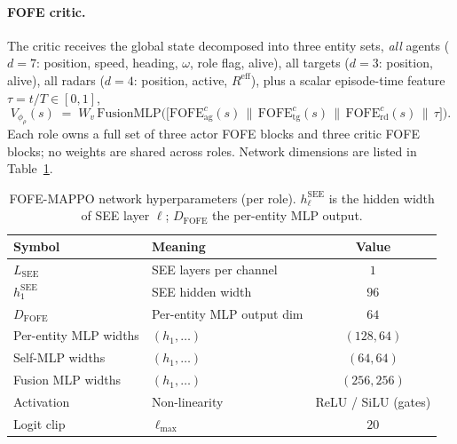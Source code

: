 \paragraph{FOFE critic.}
The critic receives the global state decomposed into three entity sets,
\emph{all} agents ($d{=}7$: position, speed, heading, $\omega$, role flag,
alive), all targets ($d{=}3$: position, alive), all radars ($d{=}4$:
position, active, $R^{\mathrm{eff}}$), plus a scalar episode-time feature
$\tau=t/T\in[0,1]$,
\begin{equation}
V_{\phi_\rho}(s) \;=\; W_v\,\mathrm{FusionMLP}\!\bigl(
\bigl[\mathrm{FOFE}^{c}_{\mathrm{ag}}(s)\,\|\,\mathrm{FOFE}^{c}_{\mathrm{tg}}(s)
\,\|\,\mathrm{FOFE}^{c}_{\mathrm{rd}}(s)\,\|\,\tau\bigr]\bigr).
\label{eq:fofe_critic}
\end{equation}
Each role owns a full set of three actor FOFE blocks and three critic FOFE
blocks; no weights are shared across roles. Network dimensions are listed in
Table~\ref{tab:fofe_params}.

\begin{table}[H]
\centering
\caption{FOFE-MAPPO network hyperparameters (per role). $h^{\mathrm{SEE}}_\ell$
is the hidden width of SEE layer $\ell$; $D_{\mathrm{FOFE}}$ the per-entity
MLP output.}
\label{tab:fofe_params}
\begin{tabular}{@{}llc@{}}
\toprule
Symbol & Meaning & Value \\ \midrule
$L_{\mathrm{SEE}}$          & SEE layers per channel                  & $1$ \\
$h^{\mathrm{SEE}}_{1}$      & SEE hidden width                        & $96$ \\
$D_{\mathrm{FOFE}}$         & Per-entity MLP output dim               & $64$ \\
Per-entity MLP widths       & $(h_1,\dots)$                           & $(128,64)$ \\
Self-MLP widths             & $(h_1,\dots)$                           & $(64,64)$ \\
Fusion MLP widths           & $(h_1,\dots)$                           & $(256,256)$ \\
Activation                  & Non-linearity                           & ReLU / SiLU (gates) \\
Logit clip                  & $\ell_{\max}$                           & $20$ \\
\bottomrule
\end{tabular}
\end{table}

